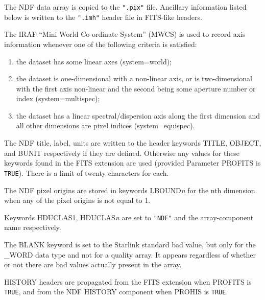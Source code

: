 \documentclass[twoside,11pt]{article}
\newcommand{\xref}[3]{#1}
\newcommand{\sstitem}{\item}
\newcommand{\sstitem}{\item}
\begin{document}
{{{         \sstitem
         The NDF data array is copied to the \texttt{".pix"} file.  Ancillary
         information listed below is written to the \texttt{".imh"} header
         file in FITS-like headers.

         \sstitem
         The IRAF ``Mini World Co-ordinate System'' (MWCS) is used to
         record axis information whenever one of the following criteria is
         satisfied:

         \begin{enumerate}
            \item the dataset has some linear axes (system=world);

            \item the dataset is one-dimensional with a non-linear axis, or is
            two-dimensional with the first axis non-linear and the
            second being some aperture number or index
            (system=multispec);

            \item the dataset has a linear spectral/dispersion axis along the
            first dimension and all other dimensions are pixel indices
            (system=equispec).
         \end{enumerate}

         \sstitem
         The NDF title, label, units are written to the header keywords
         TITLE, OBJECT, and BUNIT respectively if they are defined.
         Otherwise any values for these keywords found in the FITS
         extension are used (provided Parameter PROFITS is \texttt{TRUE}).
         There is a limit of twenty characters for each.

         \sstitem
         The NDF pixel origins are stored in keywords LBOUND\textit{n} for the
         nth dimension when any of the pixel origins is not equal to 1.

         \sstitem
         Keywords HDUCLAS1, HDUCLAS\textit{n} are set to \texttt{"NDF"} and the
         array-component name respectively.

         \sstitem
         The BLANK keyword is set to the Starlink standard
         \xref{bad value}{sun95}{se_badmasking},
         but only for the \_WORD data type and not for a quality array.  It
         appears regardless of whether or not there are bad values
         actually present in the array.

         \sstitem
         HISTORY headers are propagated from the FITS extension when
         PROFITS is \texttt{TRUE}, and from the NDF HISTORY component when
         PROHIS is \texttt{TRUE}.

}}}
\end{document}
